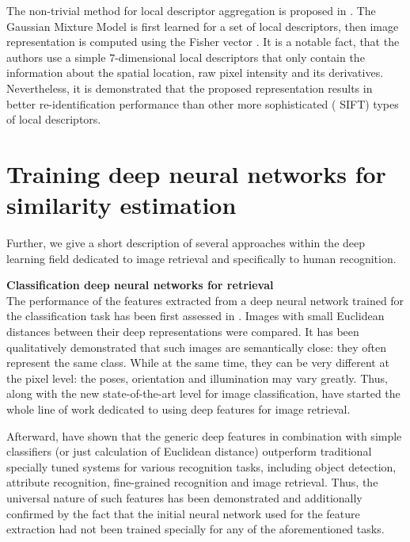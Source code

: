 
The non-trivial method for local descriptor aggregation is proposed in \citep{ma2012local}. The Gaussian Mixture Model is first learned for a set of local descriptors,  then image representation is computed using the Fisher
vector \citep{perronnin2007fisher}. It is a notable fact, that the authors use a simple $7$-dimensional local descriptors that only contain the information about the spatial location, raw pixel intensity and its derivatives. Nevertheless, it is demonstrated that the proposed representation results in better re-identification performance than other more sophisticated (\eg{} SIFT) types of local descriptors.


\section{Training deep neural networks for similarity estimation}

Further, we give a short description of several approaches within the deep learning field dedicated to image retrieval and specifically to human recognition. 


\bigskip\ident\textbf{Classification deep neural networks for retrieval}\\
The performance of the features extracted from a deep neural network trained for the classification task has been first assessed in \citep{Krizhevsky12}.  Images with small Euclidean distances between their deep representations were compared. It has been qualitatively demonstrated that such images are semantically close: they often represent the same class. While at the same time, they can be very different at the pixel level: the poses, orientation and illumination may vary greatly. 
Thus, along with the new state-of-the-art level for image classification, \citep{Krizhevsky12} have started the whole line of work dedicated to using deep features for image retrieval.

Afterward, \citep{Razavian14} have shown that the generic deep features in combination with simple classifiers (or just calculation of Euclidean distance)  outperform traditional specially tuned systems for various recognition tasks, including object detection, attribute recognition, fine-grained recognition and image retrieval. Thus, the universal nature of such features has been demonstrated and additionally confirmed by the fact that the initial neural network used for the feature extraction had not been trained specially for any of the aforementioned tasks. 

